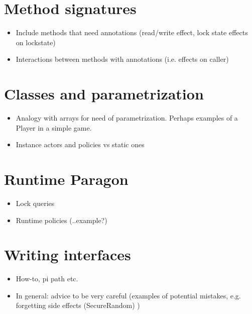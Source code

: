 \documentclass{book}
\begin{document}


\chapter{Method signatures}
\label{chap:methods}

\begin{itemize}

  \item Include methods that need annotations (read/write effect, lock state 
         effects on lockstate)
         
  \item Interactions between methods with annotations (i.e. effects on caller)

\end{itemize}

\chapter{Classes and parametrization}
\label{chap:classes}

\begin{itemize}

  \item Analogy with arrays for need of parametrization. Perhaps examples of a
        Player in a simple game.
        
  \item Instance actors and policies vs static ones

\end{itemize}

\chapter{Runtime Paragon}
\label{chap:runtime}

\begin{itemize}

  \item Lock queries
  
  \item Runtime policies (..example?)

\end{itemize}

\chapter{Writing interfaces}
\label{chap:interfaces}

\begin{itemize}

  \item How-to, pi path etc.
  
  \item In general: advice to be very careful (examples of potential mistakes,
         e.g. forgetting side effects (SecureRandom) )

\end{itemize}
\end{document}
